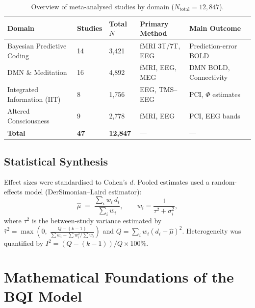 \documentclass[12pt,a4paper]{article}
\theoremstyle{plain}
\theoremstyle{definition}
\theoremstyle{remark}
\begin{document}
\begin{table}[htbp]
\centering
\caption{Overview of meta-analysed studies by domain ($N_{\text{total}}=12{,}847$).}
\label{tab:meta_overview}
\renewcommand{\arraystretch}{1.25}
\begin{tabular}{p{3.4cm}p{1.3cm}p{1.4cm}p{3.5cm}p{3.5cm}}
\toprule
\rowcolor{hdrcol}
\color{white}\textbf{Domain} &
\color{white}\textbf{Studies} &
\color{white}\textbf{Total $N$} &
\color{white}\textbf{Primary Method} &
\color{white}\textbf{Main Outcome} \\
\midrule
Bayesian Predictive Coding  & 14 & 3{,}421 & fMRI 3T/7T, EEG & Prediction-error BOLD \\
DMN \& Meditation           & 16 & 4{,}892 & fMRI, EEG, MEG  & DMN BOLD, Connectivity \\
Integrated Information (IIT)& 8  & 1{,}756 & EEG, TMS--EEG   & PCI, $\Phi$ estimates \\
Altered Consciousness       & 9  & 2{,}778 & fMRI, EEG       & PCI, EEG bands \\
\midrule
\textbf{Total}              & \textbf{47} & \textbf{12{,}847} & --- & --- \\
\bottomrule
\end{tabular}
\end{table}

\subsection{Statistical Synthesis}

Effect sizes were standardised to Cohen's $d$.
Pooled estimates used a random-effects model (DerSimonian--Laird estimator):
\begin{equation}
  \hat{\mu} \;=\; \frac{\sum_i w_i\, d_i}{\sum_i w_i},\qquad
  w_i = \frac{1}{\tau^2 + \sigma_i^2},
\end{equation}
where $\tau^2$ is the between-study variance estimated by
$\hat\tau^2 = \max\!\left(0,\;\frac{Q - (k-1)}{\sum w_i - \sum w_i^2/\sum w_i}\right)$
and $Q = \sum_i w_i(d_i - \hat\mu)^2$.
Heterogeneity was quantified by $I^2 = (Q-(k-1))/Q \times 100\%$.

\section{Mathematical Foundations of the BQI Model}
\label{sec:math}
\end{document}
